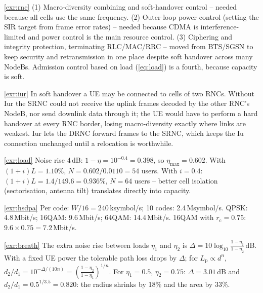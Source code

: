 \documentclass[11pt,a4paper]{article}
\begin{document}
\begin{solutionbox}{\ref{exr:rnc}}
(1) Macro-diversity combining and soft-handover control -- needed because all cells use the same
frequency. (2) Outer-loop power control (setting the SIR target from frame error rates) --
needed because CDMA is interference-limited and power control is the main resource control.
(3) Ciphering and integrity protection, terminating RLC/MAC/RRC -- moved from BTS/SGSN to keep
security and retransmission in one place despite soft handover across many NodeBs. Admission
control based on load (\cref{eq:load}) is a fourth, because capacity is soft.
\end{solutionbox}

\begin{solutionbox}{\ref{exr:iur}}
In soft handover a UE may be connected to cells of two RNCs. Without Iur the SRNC could not
receive the uplink frames decoded by the other RNC's NodeB, nor send downlink data through it;
the UE would have to perform a hard handover at every RNC border, losing macro-diversity exactly
where links are weakest. Iur lets the DRNC forward frames to the SRNC, which keeps the Iu
connection unchanged until a relocation is worthwhile.
\end{solutionbox}

\begin{solutionbox}{\ref{exr:load}}
Noise rise 4\,dB: $1-\eta = 10^{-0.4} = 0.398$, so $\eta_{\max} = 0.602$. With
$(1+i)L = 1.10\%$, $N = 0.602/0.0110 = 54$ users. With $i = 0.4$: $(1+i)L = 1.4/149.6 = 0.936\%$,
$N = 64$ users -- better cell isolation (sectorisation, antenna tilt) translates directly into
capacity.
\end{solutionbox}

\begin{solutionbox}{\ref{exr:hsdpa}}
Per code: $W/16 = 240$\,ksymbol/s; 10 codes: 2.4\,Msymbol/s. QPSK: 4.8\,Mbit/s; 16QAM:
9.6\,Mbit/s; 64QAM: 14.4\,Mbit/s. 16QAM with $r_\mathrm{c} = 0.75$: $9.6\times0.75 =
7.2$\,Mbit/s.
\end{solutionbox}

\begin{solutionbox}{\ref{exr:breath}}
The extra noise rise between loads $\eta_1$ and $\eta_2$ is
$\Delta = 10\log_{10}\frac{1-\eta_1}{1-\eta_2}$\,dB. With a fixed UE power the tolerable path
loss drops by $\Delta$; for $L_\mathrm{p}\propto d^{n}$, $d_2/d_1 = 10^{-\Delta/(10n)} =
\left(\frac{1-\eta_2}{1-\eta_1}\right)^{1/n}$. For $\eta_1=0.5$, $\eta_2=0.75$: $\Delta = 3.01$\,dB
and $d_2/d_1 = 0.5^{1/3.5} = 0.820$: the radius shrinks by 18\% and the area by 33\%.
\end{solutionbox}
\end{document}
